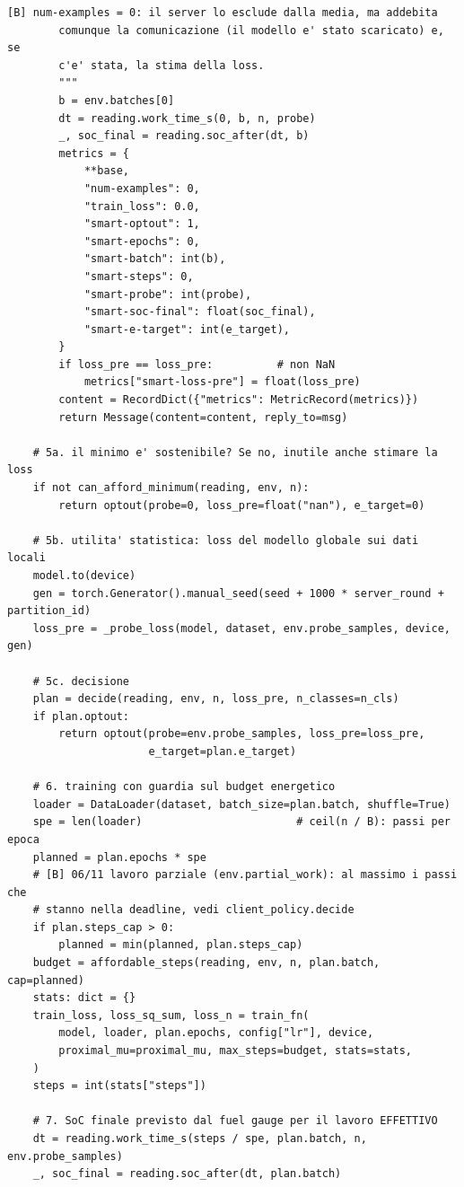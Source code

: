 \documentclass[11pt,a4paper]{article}
\begin{document}
\begin{lstlisting}[style=py,firstnumber=141,caption={\texttt{tesifl/tesiFL/client\_app.py}, lines 141--276}]
        [B] num-examples = 0: il server lo esclude dalla media, ma addebita
        comunque la comunicazione (il modello e' stato scaricato) e, se
        c'e' stata, la stima della loss.
        """
        b = env.batches[0]
        dt = reading.work_time_s(0, b, n, probe)
        _, soc_final = reading.soc_after(dt, b)
        metrics = {
            **base,
            "num-examples": 0,
            "train_loss": 0.0,
            "smart-optout": 1,
            "smart-epochs": 0,
            "smart-batch": int(b),
            "smart-steps": 0,
            "smart-probe": int(probe),
            "smart-soc-final": float(soc_final),
            "smart-e-target": int(e_target),
        }
        if loss_pre == loss_pre:          # non NaN
            metrics["smart-loss-pre"] = float(loss_pre)
        content = RecordDict({"metrics": MetricRecord(metrics)})
        return Message(content=content, reply_to=msg)

    # 5a. il minimo e' sostenibile? Se no, inutile anche stimare la loss
    if not can_afford_minimum(reading, env, n):
        return optout(probe=0, loss_pre=float("nan"), e_target=0)

    # 5b. utilita' statistica: loss del modello globale sui dati locali
    model.to(device)
    gen = torch.Generator().manual_seed(seed + 1000 * server_round + partition_id)
    loss_pre = _probe_loss(model, dataset, env.probe_samples, device, gen)

    # 5c. decisione
    plan = decide(reading, env, n, loss_pre, n_classes=n_cls)
    if plan.optout:
        return optout(probe=env.probe_samples, loss_pre=loss_pre,
                      e_target=plan.e_target)

    # 6. training con guardia sul budget energetico
    loader = DataLoader(dataset, batch_size=plan.batch, shuffle=True)
    spe = len(loader)                        # ceil(n / B): passi per epoca
    planned = plan.epochs * spe
    # [B] 06/11 lavoro parziale (env.partial_work): al massimo i passi che
    # stanno nella deadline, vedi client_policy.decide
    if plan.steps_cap > 0:
        planned = min(planned, plan.steps_cap)
    budget = affordable_steps(reading, env, n, plan.batch, cap=planned)
    stats: dict = {}
    train_loss, loss_sq_sum, loss_n = train_fn(
        model, loader, plan.epochs, config["lr"], device,
        proximal_mu=proximal_mu, max_steps=budget, stats=stats,
    )
    steps = int(stats["steps"])

    # 7. SoC finale previsto dal fuel gauge per il lavoro EFFETTIVO
    dt = reading.work_time_s(steps / spe, plan.batch, n, env.probe_samples)
    _, soc_final = reading.soc_after(dt, plan.batch)


\end{lstlisting}
\end{document}
